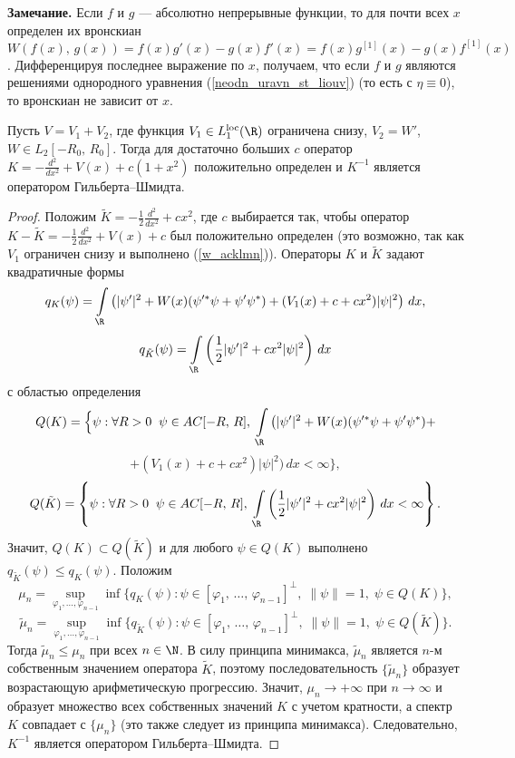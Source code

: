 \documentclass[a4paper
]{article}
\begin{document}
{\bf Замечание.} Если $f$ и $g$ --- абсолютно непрерывные функции, то
для почти всех $x$ определен их вронскиан $W(f(x), \, g(x))=f(x)g'(x)-
g(x)f'(x)=f(x)g^{[1]}(x)-g(x)f^{[1]}(x)$. Дифференцируя последнее выражение
по $x$, получаем, что если $f$ и $g$ являются решениями однородного уравнения
(\ref{neodn_uravn_st_liouv}) (то есть с $\eta\equiv 0$), то вронскиан
не зависит от $x$.
\begin{Lem}
\label{hilb_schmidt}
Пусть $V=V_1+V_2$, где функция $V_1\in L_1^{{\rm loc}}(\R)$
ограничена снизу, $V_2=W'$, $W\in L_2[-R_0, \, R_0]$. Тогда для достаточно
больших $c$ оператор $K=-\frac{d^2}{dx^2}+V(x)+c(1+x^2)$ положительно
определен и $K^{-1}$ является оператором Гильберта--Шмидта.
\end{Lem}
\begin{proof}
Положим $\tilde K=-\frac12\frac{d^2}{dx^2}+cx^2$, где $c$ выбирается так,
чтобы оператор $K-\tilde K=-\frac12 \frac{d^2}{dx^2}+V(x)+c$ был положительно
определен (это возможно, так как $V_1$ ограничен снизу и выполнено (\ref{w_acklmn})).
Операторы $K$ и $\tilde K$ задают квадратичные
формы $$q_K(\psi)=\int \limits_{\R} \left(|\psi'|^2+W(x)(\psi'^*\psi+
\psi'\psi^*)+(V_1(x)+c+cx^2)|\psi|^2\right)\, dx,$$
$$q_{\tilde K}(\psi)=\int \limits_{\R} \left(\frac12|\psi'|^2+cx^2|\psi|^2
\right)\, dx$$ с областью определения
$$Q(K)=\Big\{\psi:\forall R>0\; \; \psi\in AC[-R, \, R], \; \int
\limits_{\R} \big(|\psi'|^2+W(x)(\psi'^*\psi+\psi'\psi^*)+$$
$$+(V_1(x)+c+ cx^2)|\psi|^2\big)\, dx<\infty\Big\},$$
$$Q(\tilde K)=\left\{\psi:\forall R>0 \; \; \psi\in AC[-R, \, R], \; \int
\limits_{\R} \left(\frac12|\psi'|^2+cx^2|\psi|^2\right)\,
dx<\infty\right\}.$$ Значит, $Q(K)\subset Q(\tilde K)$ и для
любого $\psi\in Q(K)$ выполнено $q_{\tilde K}(\psi)\le q_K(\psi)$. Положим
$$\mu_n=\sup_{\varphi_1,\dots,\varphi_{n-1}}
\inf\{q_K(\psi):\psi\in [\varphi_1, \, \dots, \,
\varphi_{n-1}]^{\bot}, \; \|\psi\|=1, \; \psi\in Q(K)\},$$
$$\tilde \mu_n=\sup_{\varphi_1,\dots,\varphi_{n-1}}\inf\{ q_{\tilde K}
(\psi):\psi\in [\varphi_1, \, \dots, \, \varphi_{n-1}]^{\bot}, \;
\|\psi\|=1, \; \psi\in Q(\tilde K)\}.$$ Тогда $\tilde \mu_n\le \mu_n$
при всех $n\in \N$. В силу принципа минимакса, $\tilde \mu_n$
является $n$-м собственным значением оператора $\tilde K$, поэтому
последовательность $\{\tilde \mu_n\}$ образует возрастающую
арифметическую прогрессию. Значит, $\mu_n\rightarrow +\infty$ при
$n\rightarrow \infty$ и образует множество всех собственных значений
$K$ с учетом кратности, а спектр $K$ совпадает с $\{\mu_n\}$ (это
также следует из принципа минимакса). Следовательно, $K^{-1}$ является
оператором Гильберта--Шмидта.
\end{proof}
\end{document}
